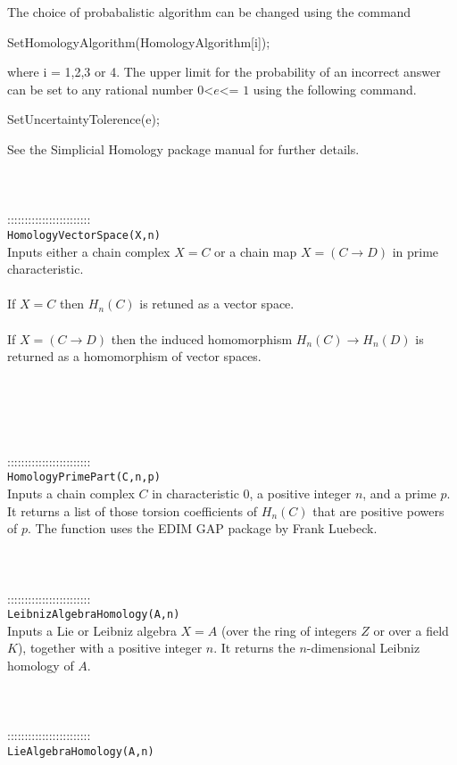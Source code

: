 \documentclass[a4paper,11pt]{report}
\begin{document}
{ The choice of probabalistic algorithm can be changed using the command 

 SetHomologyAlgorithm(HomologyAlgorithm[i]);

 where i = 1,2,3 or 4. The upper limit for the probability of an incorrect
answer can be set to any rational number $0${\textless}$e${\textless}= $1$ using the following command. 

SetUncertaintyTolerence(e);

 See the Simplicial Homology package manual for further details. \\
 \\
 \\
 \\
 ::::::::::::::::::::::::\\
 \texttt{HomologyVectorSpace(X,n)}\\
 

 Inputs either a chain complex $X=C$ or a chain map $X=(C \longrightarrow D)$ in prime characteristic. \\
 \\
If $X=C$ then $H_n(C)$ is retuned as a vector space.\\
 \\
 If $X=(C \longrightarrow D)$ then the induced homomorphism $H_n(C) \longrightarrow H_n(D)$ is returned as a homomorphism of vector spaces. \\
 \\
 \\
 \\
 \\
 \\
 ::::::::::::::::::::::::\\
 \texttt{HomologyPrimePart(C,n,p)}\\
 

 Inputs a chain complex $C$ in characteristic 0, a positive integer $n$, and a prime $p$. It returns a list of those torsion coefficients of $H_n(C)$ that are positive powers of $p$. The function uses the EDIM GAP package by Frank Luebeck. \\
 \\
 \\
 \\
 ::::::::::::::::::::::::\\
 \texttt{LeibnizAlgebraHomology(A,n)}\\
 

 Inputs a Lie or Leibniz algebra $X=A$ (over the ring of integers $Z$ or over a field $K$), together with a positive integer $n$. It returns the $n$-dimensional Leibniz homology of $A$. \\
 \\
 \\
 \\
 ::::::::::::::::::::::::\\
 \texttt{LieAlgebraHomology(A,n)}\\
 

}
\end{document}

